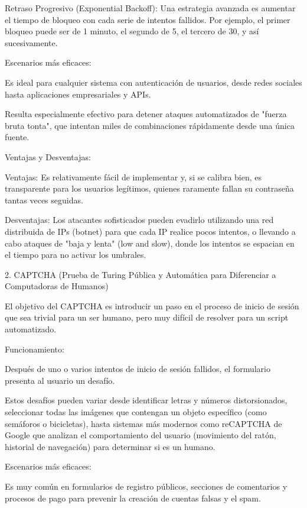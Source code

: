 \documentclass[letter,12pt]{article}
\begin{document}
        Retraso Progresivo (Exponential Backoff): Una estrategia avanzada es aumentar el tiempo de bloqueo con cada serie de intentos fallidos. Por ejemplo, el primer bloqueo puede ser de 1 minuto, el segundo de 5, el tercero de 30, y así sucesivamente.

    Escenarios más eficaces:

        Es ideal para cualquier sistema con autenticación de usuarios, desde redes sociales hasta aplicaciones empresariales y APIs.

        Resulta especialmente efectivo para detener ataques automatizados de "fuerza bruta tonta", que intentan miles de combinaciones rápidamente desde una única fuente.

    Ventajas y Desventajas:

        Ventajas: Es relativamente fácil de implementar y, si se calibra bien, es transparente para los usuarios legítimos, quienes raramente fallan su contraseña tantas veces seguidas.

        Desventajas: Los atacantes sofisticados pueden evadirlo utilizando una red distribuida de IPs (botnet) para que cada IP realice pocos intentos, o llevando a cabo ataques de "baja y lenta" (low and slow), donde los intentos se espacian en el tiempo para no activar los umbrales.

2. CAPTCHA (Prueba de Turing Pública y Automática para Diferenciar a Computadoras de Humanos)

El objetivo del CAPTCHA es introducir un paso en el proceso de inicio de sesión que sea trivial para un ser humano, pero muy difícil de resolver para un script automatizado.

    Funcionamiento:

        Después de uno o varios intentos de inicio de sesión fallidos, el formulario presenta al usuario un desafío.

        Estos desafíos pueden variar desde identificar letras y números distorsionados, seleccionar todas las imágenes que contengan un objeto específico (como semáforos o bicicletas), hasta sistemas más modernos como reCAPTCHA de Google que analizan el comportamiento del usuario (movimiento del ratón, historial de navegación) para determinar si es un humano.

    Escenarios más eficaces:

        Es muy común en formularios de registro públicos, secciones de comentarios y procesos de pago para prevenir la creación de cuentas falsas y el spam.
\end{document}
